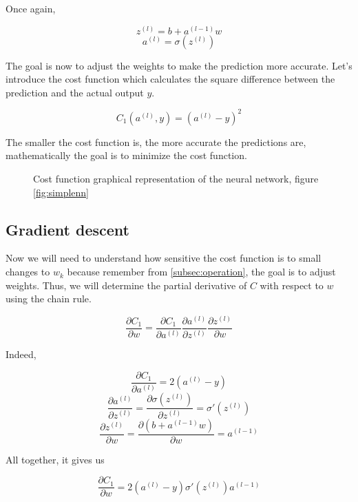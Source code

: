 \documentclass[]{report}
\begin{document}
{Once again,}

\[z^{(l)}=b+a^{(l-1)}w\]
\[a^{(l)}=\sigma\left(z^{(l)}\right)\]

{The goal is now to adjust the weights to make the prediction more accurate. Let's introduce the cost function which calculates the square difference between the prediction and the actual output $y$.}

\[C_1\left(a^{(l)},y\right)=\left(a^{(l)}-y\right)^2\]

{The smaller the cost function is, the more accurate the predictions are, mathematically the goal is to minimize the cost function.}

\begin{figure}[H]
    \centering
    \caption{Cost function graphical representation of the neural network, figure \ref{fig:simplenn}}
\end{figure}

\subsection{Gradient descent}

{Now we will need to understand how sensitive the cost function is to small changes to $w_k$ because remember from \ref{subsec:operation}, the goal is to adjust weights. Thus, we will determine the partial derivative of $C$ with respect to $w$ using the chain rule.}

\[{\frac{\partial C_1}{\partial w}=\frac{\partial C_1}{\partial a^{(l)}} \frac{\partial a^{(l)}}{\partial z^{(l)}} \frac{\partial  z^{(l)}}{\partial w}}\]

{Indeed,}

\[\frac{\partial C_1}{\partial a^{(l)}}=2\left(a^{(l)}-y\right)\]
\[\frac{\partial a^{(l)}}{\partial z^{(l)}}=\frac{\partial \sigma\left(z^{(l)}\right)}{\partial z^{(l)}}=\sigma\prime\left(z^{(l)}\right)\]
\[\frac{\partial  z^{(l)}}{\partial w}=\frac{\partial  \left(b+a^{(l-1)}w\right)}{\partial w}=a^{(l-1)}\]

{All together, it gives us}

\[\frac{\partial C_1}{\partial w}=2\left(a^{(l)}-y\right) \sigma\prime\left(z^{(l)}\right) a^{(l-1)}\]
\end{document}
